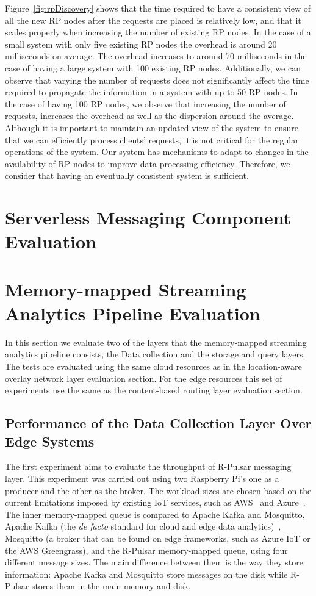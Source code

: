 Figure~\ref{fig:rpDiscovery} shows that the time required to have a consistent view of all the new RP nodes after the requests are placed is relatively low, and that it scales properly when increasing the number of existing RP nodes. In the case of a small system with only five existing RP nodes the overhead is around 20 milliseconds on average. The overhead increases to around 70 milliseconds in the case of having a large system with 100 existing RP nodes. Additionally, we can observe that varying the number of requests does not significantly affect the time required to propagate the information in a system with up to 50 RP nodes. In the case of having 100 RP nodes, we observe that increasing the number of requests, increases the overhead as well as the dispersion around the average. Although it is important to maintain an updated view of the system to ensure that we can efficiently process clients' requests, it is not critical for the regular operations of the system. Our system has mechanisms to adapt to changes in the availability of RP nodes to improve data processing efficiency. Therefore, we consider that having an eventually consistent system is sufficient. 

\section{Serverless Messaging Component Evaluation}

\section{Memory-mapped Streaming Analytics Pipeline Evaluation}

In this section we evaluate two of the layers that the memory-mapped streaming analytics pipeline consists, the Data collection and the storage and query layers. The tests are evaluated using the same cloud resources as in the location-aware overlay network layer evaluation section. For the edge resources this set of experiments use the same as the content-based routing layer evaluation section. 

\subsection{Performance of the Data Collection Layer Over Edge Systems}

The first experiment aims to evaluate the throughput of R-Pulsar messaging layer. This experiment was carried out using two Raspberry Pi's one as a producer and the other as the broker. The workload sizes are chosen based on the current limitations imposed by existing IoT services, such as AWS~\cite{AWS-MQTT} and Azure~\cite{AZURE-MQTT}. The inner memory-mapped queue is compared to Apache Kafka and Mosquitto. Apache Kafka (the \textit{de facto} standard for cloud and edge data analytics)~\cite{Young2017, firework, planner}, Mosquitto (a broker that can be found on edge frameworks, such as Azure IoT or the AWS Greengrass), and the R-Pulsar memory-mapped queue, using four different message sizes.  The main difference between them is the way they store information: Apache Kafka and Mosquitto store messages on the disk while R-Pulsar stores them in the main memory and disk. 

